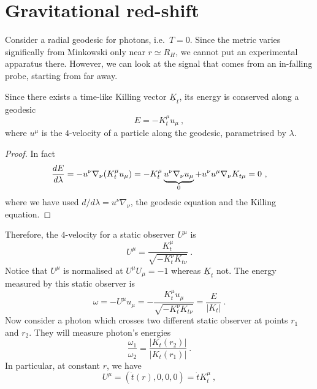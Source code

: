 \section{Gravitational red-shift}

    Consider a radial geodesic for photons, i.e.~$T = 0$. Since the metric varies significally from Minkowski only near $r \simeq R_H$, we cannot put an experimental apparatus there. However, we can look at the signal that comes from an in-falling probe, starting from far away.

    Since there exists a time-like Killing vector $\underline K_t$, its energy is conserved along a geodesic
    \begin{equation*}
        E = - K^\mu_t u_\mu ~,
    \end{equation*}
    where $u^\mu$ is the $4$-velocity of a particle along the geodesic, parametrised by $\lambda$.
    \begin{proof}
        In fact
        \begin{equation*}
            \frac{dE}{d\lambda} = - u^\nu \nabla_\nu (K^\mu_t u_\mu) = - K^\mu_t \underbrace{u^\nu \nabla_\nu u_\mu}_0 + u^\nu u^\mu \nabla_\nu K_{t\mu} = 0 ~,
        \end{equation*}
        where we have used $d/d\lambda = u^\nu \nabla_\nu$, the geodesic equation and the Killing equation. 
    \end{proof}
    Therefore, the $4$-velocity for a static observer $U^\mu$ is 
    \begin{equation*}
        U^\mu = \frac{K^\mu_t}{\sqrt{-K^\nu_t K_{t\nu}}} ~.
    \end{equation*}
    Notice that $U^\mu$ is normalised at $U^\mu U_\mu = -1$ whereas $\underline K_t$ not. The energy measured by this static observer is 
    \begin{equation*}
        \omega = - U^\mu u_\mu = - \frac{K^\mu_t u_\mu}{\sqrt{-K^\nu_t K_{t\nu}}} = \frac{E}{|K_t|} ~.
    \end{equation*}
    Now consider a photon which crosses two different static observer at points $r_1$ and $r_2$. They will measure photon's energies 
    \begin{equation*}
        \frac{\omega_1}{\omega_2} = \frac{|K_t (r_2)|}{|K_t(r_1)|} ~.
    \end{equation*}
    In particular, at constant $r$, we have 
    \begin{equation*}
        U^\mu = (\dot t(r), 0, 0, 0) = \dot t K^\mu_t ~,
    \end{equation*}
